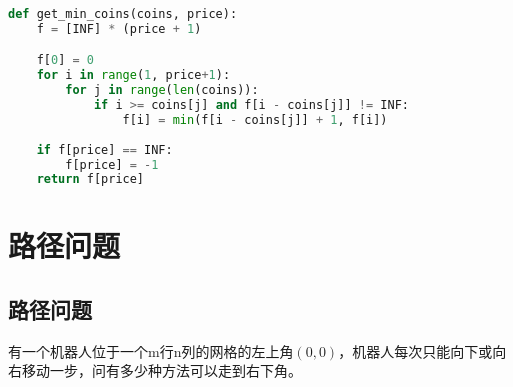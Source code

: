
\begin{lstlisting}[language=Python]
def get_min_coins(coins, price):
    f = [INF] * (price + 1)

    f[0] = 0
    for i in range(1, price+1):
        for j in range(len(coins)):
            if i >= coins[j] and f[i - coins[j]] != INF:
                f[i] = min(f[i - coins[j]] + 1, f[i])
        
    if f[price] == INF:
        f[price] = -1
    return f[price]
\end{lstlisting}

\newpage

\section{路径问题}

\subsection{路径问题}

有一个机器人位于一个m行n列的网格的左上角$ (0, 0) $，机器人每次只能向下或向右移动一步，问有多少种方法可以走到右下角。

\begin{table}[H]
	\centering
	\caption{起点}
\end{table}

